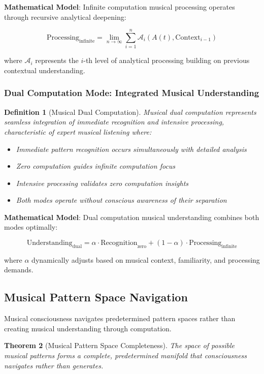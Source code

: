 \documentclass[12pt,a4paper]{article}
\newtheorem{theorem}{Theorem}[section]
\newtheorem{definition}[theorem]{Definition}
\begin{document}
\textbf{Mathematical Model}:
Infinite computation musical processing operates through recursive analytical deepening:

$$\text{Processing}_{\text{infinite}} = \lim_{n \to \infty} \sum_{i=1}^{n} \mathcal{A}_i(A(t), \text{Context}_{i-1})$$

where $\mathcal{A}_i$ represents the $i$-th level of analytical processing building on previous contextual understanding.

\subsubsection{Dual Computation Mode: Integrated Musical Understanding}

\begin{definition}[Musical Dual Computation]
Musical dual computation represents seamless integration of immediate recognition and intensive processing, characteristic of expert musical listening where:
\begin{itemize}
\item Immediate pattern recognition occurs simultaneously with detailed analysis
\item Zero computation guides infinite computation focus
\item Intensive processing validates zero computation insights
\item Both modes operate without conscious awareness of their separation
\end{itemize}
\end{definition}

\textbf{Mathematical Model}:
Dual computation musical understanding combines both modes optimally:

$$\text{Understanding}_{\text{dual}} = \alpha \cdot \text{Recognition}_{\text{zero}} + (1-\alpha) \cdot \text{Processing}_{\text{infinite}}$$

where $\alpha$ dynamically adjusts based on musical context, familiarity, and processing demands.

\subsection{Musical Pattern Space Navigation}

Musical consciousness navigates predetermined pattern spaces rather than creating musical understanding through computation.

\begin{theorem}[Musical Pattern Space Completeness]
The space of possible musical patterns forms a complete, predetermined manifold that consciousness navigates rather than generates.
\end{theorem}
\end{document}
